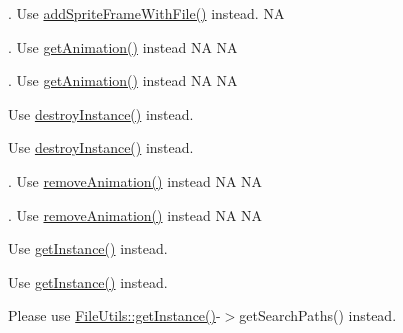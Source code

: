 \begin{DoxyRefList}
. Use \hyperlink{classAnimation_ab57ae7ddaf2adca5d944d931e892d203}{add\+Sprite\+Frame\+With\+File()} instead.  NA  
\item[\label{deprecated__deprecated000022}%
\Hypertarget{deprecated__deprecated000022}%
Member \hyperlink{classAnimationCache_aaf38bd2ec7783124ebe9adfbb146bd23}{Animation\+Cache\+:\+:animation\+By\+Name} (const std\+::string \&name)]. Use \hyperlink{classAnimationCache_ac9674f5e186bcec23f622cd62c1b873a}{get\+Animation()} instead  NA  NA 

. Use \hyperlink{classAnimationCache_ac9674f5e186bcec23f622cd62c1b873a}{get\+Animation()} instead  NA  NA  
\item[\label{deprecated__deprecated000020}%
\Hypertarget{deprecated__deprecated000020}%
Member \hyperlink{classAnimationCache_ad9863fb791f64c88908c5b6e3a8ce745}{Animation\+Cache\+:\+:purge\+Shared\+Animation\+Cache} ()]Use \hyperlink{classAnimationCache_afb31dcea7d004565aaf1b871e59eec30}{destroy\+Instance()} instead. 

Use \hyperlink{classAnimationCache_afb31dcea7d004565aaf1b871e59eec30}{destroy\+Instance()} instead.  
\item[\label{deprecated__deprecated000021}%
\Hypertarget{deprecated__deprecated000021}%
Member \hyperlink{classAnimationCache_a67e8c52d54b5615c58c896eaa617a716}{Animation\+Cache\+:\+:remove\+Animation\+By\+Name} (const std\+::string \&name)]. Use \hyperlink{classAnimationCache_a7e3f77ac879a17a8418cdb80aebb2ca7}{remove\+Animation()} instead  NA  NA 

. Use \hyperlink{classAnimationCache_a7e3f77ac879a17a8418cdb80aebb2ca7}{remove\+Animation()} instead  NA  NA  
\item[\label{deprecated__deprecated000019}%
\Hypertarget{deprecated__deprecated000019}%
Member \hyperlink{classAnimationCache_ad8f32209ad141f9244ec14ba960579f0}{Animation\+Cache\+:\+:shared\+Animation\+Cache} ()]Use \hyperlink{classAnimationCache_af742b69910d1739949ac532cfc3ea30c}{get\+Instance()} instead. 

Use \hyperlink{classAnimationCache_af742b69910d1739949ac532cfc3ea30c}{get\+Instance()} instead.  
\item[\label{deprecated__deprecated000121}%
\Hypertarget{deprecated__deprecated000121}%
Member \hyperlink{classApplication_ab0fc99cfeb7f303e68825bde2030ec3e}{Application\+:\+:get\+Resource\+Root\+Path} (void)]Please use \hyperlink{classFileUtils_ac8ced4394d59f5459445ced27ccd0e8a}{File\+Utils\+::get\+Instance()}-\/$>$get\+Search\+Paths() instead. 


\end{DoxyRefList}
